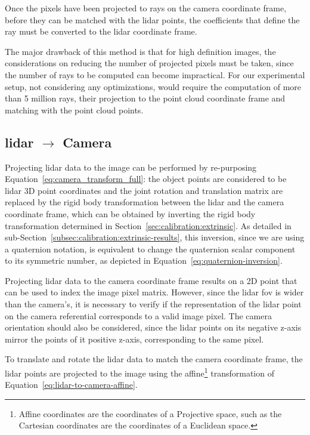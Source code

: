 Once the pixels have been projected to rays on the camera coordinate frame, before they can be matched with the \ac{lidar} points, the coefficients that define the ray must be converted to the \ac{lidar} coordinate frame.

The major drawback of this method is that for high definition images, the considerations on reducing the number of projected pixels must be taken, since the number of rays to be computed can become impractical. For our experimental setup, not considering any optimizations, would require the computation of more than 5 million rays, their projection to the point cloud coordinate frame and matching with the point cloud points.


\subsection{\ac{lidar} $\rightarrow$ Camera}
\label{subsec:sensor-fusion-lidar-to-camera}
Projecting \ac{lidar} data to the image can be performed by re-purposing Equation~\eqref{eq:camera_transform_full}: the object points are considered to be \ac{lidar} 3D point coordinates and the joint rotation and translation matrix are replaced by the rigid body transformation between the \ac{lidar} and the camera coordinate frame, which can be obtained by inverting the rigid body transformation determined in Section~\ref{sec:calibration:extrinsic}. As detailed in sub-Section~\ref{subsec:calibration:extrinsic-results}, this inversion, since we are using a quaternion notation, is equivalent to change the quaternion scalar component to its symmetric number, as depicted in Equation~\eqref{eq:quaternion-inversion}.

Projecting \ac{lidar} data to the camera coordinate frame results on a 2D point that can be used to index the image pixel matrix. However, since the \ac{lidar} \ac{fov} is wider than the camera's, it is necessary to verify if the representation of the \ac{lidar} point on the camera referential corresponds to a valid image pixel. The camera orientation should also be considered, since the \ac{lidar} points on its negative z-axis mirror the points of it positive z-axis, corresponding to the same pixel.

To translate and rotate the \ac{lidar} data to match the camera coordinate frame, the \ac{lidar} points are projected to the image using the affine\footnote{Affine coordinates are the coordinates of a Projective space, such as the Cartesian coordinates are the coordinates of a Euclidean space.} transformation of Equation~\eqref{eq:lidar-to-camera-affine}. 

